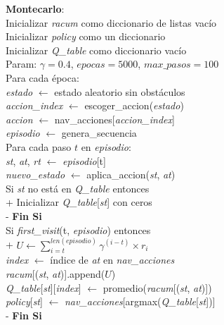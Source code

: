 \documentclass[conference,a4paper]{IEEEtran}
\begin{document}
  \begin{pseudo}[compact]
    \textbf{Montecarlo}: \\
    Inicializar \textit{racum} como diccionario de listas vacío \\
    Inicializar \textit{policy} como un diccionario\\ 
    Inicializar \textit{Q\_table} como diccionario vacío \\
    Param: $\gamma = 0.4$, $epocas = 5000$, $max\_pasos = 100$ \\
    Para cada época: \\
    \> \textit{estado} $\leftarrow$ estado aleatorio sin obstáculos \\
    \> \textit{accion\_index} $\leftarrow$ escoger\_accion(\textit{estado}) \\
    \> \textit{accion} $\leftarrow$ nav\_acciones[\textit{accion\_index}] \\
    \> \textit{episodio} $\leftarrow$ genera\_secuencia\\
    \> Para cada paso $t$ en \textit{episodio}: \\
    \> \> \textit{st}, \textit{at}, \textit{rt} $\leftarrow$ \textit{episodio}[t] \\
    \> \> \textit{nuevo\_estado} $\leftarrow$ aplica\_accion(\textit{st}, \textit{at}) \\
    \> \> Si \textit{st} no está en \textit{Q\_table} entonces \\+
      Inicializar \textit{Q\_table}[\textit{st}] con ceros \\-
    \> \> \textbf{Fin Si} \\
    \> \> Si \textit{first\_visit}(t, \textit{episodio}) entonces \\+
      $U \leftarrow \sum_{i=t}^{len(episodio)} \gamma^{(i-t)} \times r_i$ \\
      \textit{index} $\leftarrow$ índice de \textit{at} en \textit{nav\_acciones} \\
      \textit{racum}[(\textit{st}, \textit{at})].append($U$) \\
      \textit{Q\_table}[\textit{st}][\textit{index}] $\leftarrow$ promedio(\textit{racum}[(\textit{st}, \textit{at})]) \\
      \textit{policy}[\textit{st}] $\leftarrow$ \textit{nav\_acciones}[argmax(\textit{Q\_table}[\textit{st}])] \\-
    \> \> \textbf{Fin Si} \\
    \\
  \end{pseudo}
  
\end{document}
